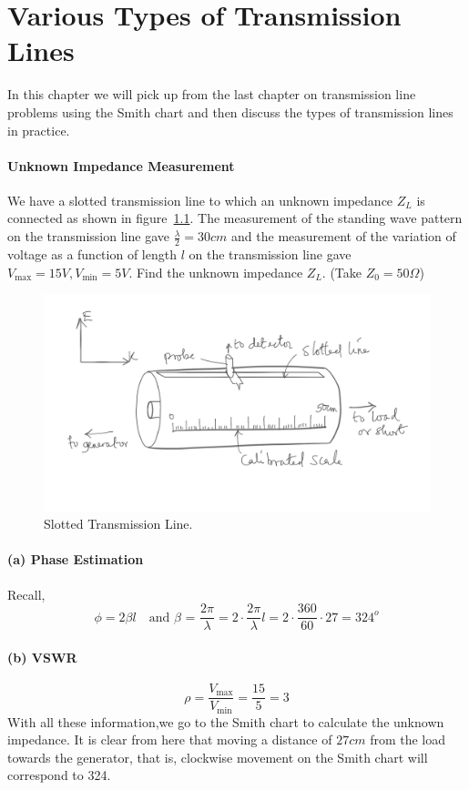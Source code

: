 \chapter{Various Types of Transmission Lines}\label{lec:lec15}
In this chapter we will pick up from the last chapter on transmission line problems using the Smith chart and then discuss the types of transmission lines in practice. 

\begin{exmp}
\subsubsection*{Unknown Impedance Measurement}
We have a slotted transmission line to which an unknown impedance $Z_L$ is connected as shown in figure~\ref{fig:fig3}. The measurement of the standing wave pattern on the transmission line gave $\frac{\lambda}{2}=30cm$ and the measurement of the variation of voltage as a function of length $l$ on the transmission line gave $V_\max=15V,V_\min=5V$. Find the unknown impedance $Z_L$. (Take $Z_0 = 50\varOmega$)
\begin{figure}[h]
\centering
\includegraphics[width=1\linewidth]{./graphics/slotted_line_problem_temp}
\caption{Slotted Transmission Line.}
\label{fig:fig3}
\end{figure}

\subsubsection*{(a) Phase Estimation}
Recall,
\begin{dmath*}
\phi=2\beta l\quad\text{and }\beta\text{ = }\dfrac{2\pi}{\lambda}
=2\cdot\dfrac{2\pi}{\lambda} l
=2\cdot\dfrac{360}{60}\cdot27
=324^{o}
\end{dmath*}
\subsubsection*{(b) VSWR}
\begin{equation*}
\rho=\frac{V_\max}{V_\min}=\frac{15}{5}=3
\end{equation*}
With all these information,we go to the Smith chart to calculate the unknown impedance. It is clear from here that moving a distance of $27cm$ from the load towards the generator, that is, clockwise movement on the Smith chart will correspond to 324\textdegree.


\end{exmp}
